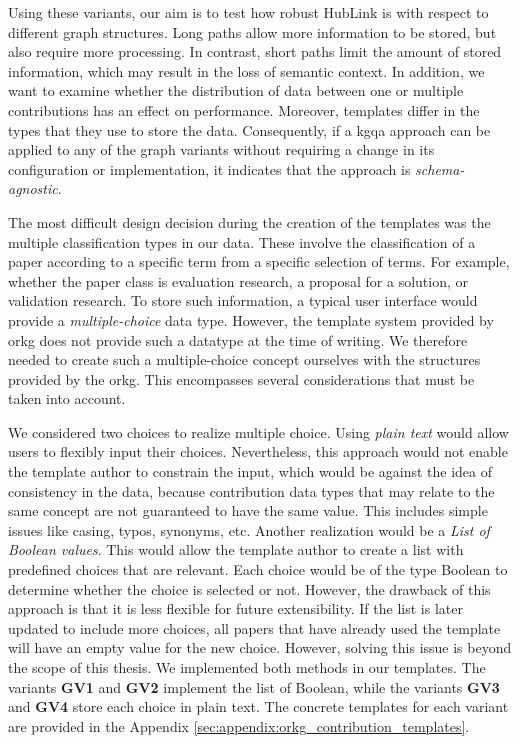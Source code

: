 Using these variants, our aim is to test how robust HubLink is with respect to different graph structures. Long paths allow more information to be stored, but also require more processing. In contrast, short paths limit the amount of stored information, which may result in the loss of semantic context. In addition, we want to examine whether the distribution of data between one or multiple contributions has an effect on performance. Moreover, templates differ in the types that they use to store the data. Consequently, if a \gls{kgqa} approach can be applied to any of the graph variants without requiring a change in its configuration or implementation, it indicates that the approach is \emph{schema-agnostic}. 

The most difficult design decision during the creation of the templates was the multiple classification types in our data. These involve the classification of a paper according to a specific term from a specific selection of terms. For example, whether the paper class is evaluation research, a proposal for a solution, or validation research. To store such information, a typical user interface would provide a \emph{multiple-choice} data type. However, the template system provided by \gls{orkg} does not provide such a datatype at the time of writing. We therefore needed to create such a multiple-choice concept ourselves with the structures provided by the \gls{orkg}. This encompasses several considerations that must be taken into account.

We considered two choices to realize multiple choice. Using \emph{plain text} would allow users to flexibly input their choices. Nevertheless, this approach would not enable the template author to constrain the input, which would be against the idea of consistency in the data, because contribution data types that may relate to the same concept are not guaranteed to have the same value. This includes simple issues like casing, typos, synonyms, etc. Another realization would be a \emph{List of Boolean values}. This would allow the template author to create a list with predefined choices that are relevant. Each choice would be of the type Boolean to determine whether the choice is selected or not. However, the drawback of this approach is that it is less flexible for future extensibility. If the list is later updated to include more choices, all papers that have already used the template will have an empty value for the new choice. However, solving this issue is beyond the scope of this thesis. We implemented both methods in our templates. The variants \textbf{GV1} and \textbf{GV2} implement the list of Boolean, while the variants \textbf{GV3} and \textbf{GV4} store each choice in plain text. The concrete templates for each variant are provided in the Appendix \ref{sec:appendix:orkg_contribution_templates}.

